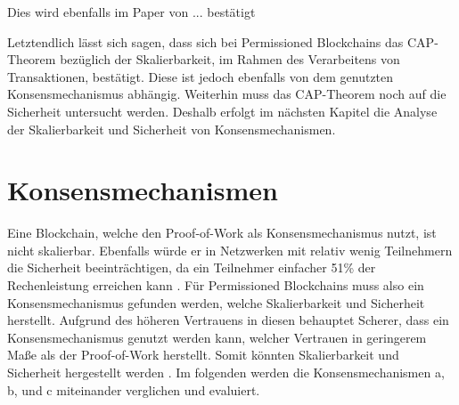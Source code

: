 Dies wird ebenfalls im Paper von ... bestätigt

Letztendlich lässt sich sagen, dass sich bei Permissioned Blockchains das CAP-Theorem bezüglich der Skalierbarkeit, im Rahmen des Verarbeitens von Transaktionen, bestätigt. Diese ist jedoch ebenfalls von dem genutzten Konsensmechanismus abhängig. Weiterhin muss das CAP-Theorem noch auf die Sicherheit untersucht werden. Deshalb erfolgt im nächsten Kapitel die Analyse der Skalierbarkeit und Sicherheit von Konsensmechanismen.


\label{subsec:eval-konsens}
\section{Konsensmechanismen}
Eine Blockchain, welche den Proof-of-Work als Konsensmechanismus nutzt, ist nicht skalierbar. Ebenfalls würde er in Netzwerken mit relativ wenig Teilnehmern die Sicherheit beeinträchtigen, da ein Teilnehmer einfacher 51\% der Rechenleistung erreichen kann \cite{Gramolidangerprivateblockchains2016}. Für Permissioned Blockchains muss also ein Konsensmechanismus gefunden werden, welche Skalierbarkeit und Sicherheit herstellt. Aufgrund des höheren Vertrauens in diesen behauptet Scherer, dass ein Konsensmechanismus genutzt werden kann, welcher Vertrauen in geringerem Maße als der Proof-of-Work herstellt. Somit könnten Skalierbarkeit und Sicherheit hergestellt werden \cite{SchererPerformanceScalabilityBlockchain2017}. Im folgenden werden die Konsensmechanismen a, b, und c miteinander verglichen und evaluiert.

